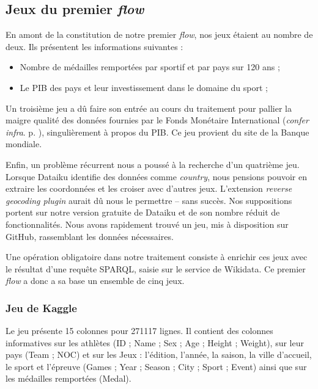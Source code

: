 \documentclass[hidelinks, 12pt]{article}
\begin{document}
\subsection{Jeux du premier \emph{flow}}

En amont de la constitution de notre premier \emph{flow}, nos jeux étaient au nombre de deux. Ils présentent les informations suivantes :
\begin{itemize}
	\item Nombre de médailles remportées par sportif et par pays sur 120 ans\autocite{kaggle} ;
	\item Le PIB des pays et leur investissement dans le domaine du sport\autocite{fmi} ;
\end{itemize}

Un troisième jeu a dû faire son entrée au cours du traitement pour pallier la maigre qualité des données fournies par le Fonds Monétaire International (\emph{confer infra}. p. \pageref{banquemondiale}), singulièrement à propos du PIB. Ce jeu provient du site de la Banque mondiale\autocite{worldbank}.

Enfin, un problème récurrent nous a poussé à la recherche d'un quatrième jeu. Lorsque Dataiku identifie des données comme \emph{country}, nous pensions pouvoir en extraire les coordonnées et les croiser avec d'autres jeux. L'extension \emph{reverse geocoding plugin} aurait dû nous le permettre -- sans succès. Nos suppositions portent sur notre version gratuite de Dataiku et de son nombre réduit de fonctionnalités. Nous avons rapidement trouvé un jeu, mis à disposition sur GitHub\autocite{github}, rassemblant les données nécessaires.

Une opération obligatoire dans notre traitement consiste à enrichir ces jeux avec le résultat d'une requête SPARQL, saisie sur le service de Wikidata. Ce premier \emph{flow} a donc a sa base un ensemble de cinq jeux.





\subsubsection{Jeu de Kaggle}

Le jeu présente 15 colonnes pour 271117 lignes. Il contient des colonnes informatives sur les athlètes (ID ; Name ; Sex ; Age ; Height ; Weight), sur leur pays (Team ; NOC) et sur les Jeux : l'édition, l'année, la saison, la ville d'accueil, le sport et l'épreuve (Games ; Year ; Season ; City ; Sport ; Event) ainsi que sur les médailles remportées (Medal).
\end{document}
